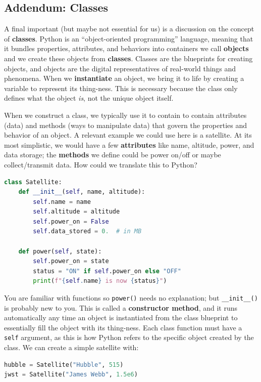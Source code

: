 \documentclass{tufte-book}
\begin{document}
\subsection{Addendum: Classes}

A final important (but maybe not essential for us) is a discussion on the concept of \textbf{classes}. Python is an ``object-oriented programming'' language, meaning that it bundles properties, attributes, and behaviors into containers we call \textbf{objects} and we create these objects from \textbf{classes}. Classes are the blueprints for creating objects, and objects are the digital representatives of real-world things and phenomena. When we \textbf{instantiate} an object, we bring it to life by creating a variable to represent its thing-ness. This is necessary because the class only defines what the object \textit{is}, not the unique object itself.

When we construct a class, we typically use it to contain to contain attributes (data) and methods (ways to manipulate data) that govern the properties and behavior of an object. A relevant example we could use here is a satellite. At its most simplistic, we would have a few \textbf{attributes} like name, altitude, power, and data storage; the \textbf{methods} we define could be power on/off or maybe collect/transmit data. How could we translate this to Python?

\begin{lstlisting}[language=Python, showstringspaces=false,backgroundcolor=\color{lightgray}, breaklines=true]
class Satellite:
    def __init__(self, name, altitude):
        self.name = name
        self.altitude = altitude
        self.power_on = False
        self.data_stored = 0.  # in MB

    def power(self, state):
        self.power_on = state
        status = "ON" if self.power_on else "OFF"
        print(f"{self.name} is now {status}")
\end{lstlisting}

You are familiar with functions so \verb|power()| needs no explanation; but \verb|__init__()| is probably new to you. This is called a \textbf{constructor method}, and it runs automatically any time an object is instantiated from the class blueprint to essentially fill the object with its thing-ness. Each class function must have a \verb|self| argument, as this is how Python refers to the specific object created by the class. We can create a simple satellite with:

\begin{lstlisting}[language=Python, showstringspaces=false,backgroundcolor=\color{lightgray}, breaklines=true]
hubble = Satellite("Hubble", 515)
jwst = Satellite("James Webb", 1.5e6)
\end{lstlisting}
\end{document}
